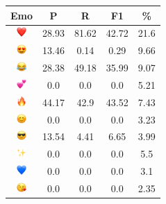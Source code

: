 \documentclass{article}
\begin{document}
\begin{table}
\centering
\begin{tabular}{|c|ccc|c|} \hline
\textbf{Emo} & \textbf{P} & \textbf{R} & \textbf{F1} & \textbf{\%} \\ \hline
\includegraphics[height=0.37cm,width=0.37cm]{img/red_heart.png} & 28.93 & 81.62 & 42.72 & 21.6\\ 
\includegraphics[height=0.37cm,width=0.37cm]{img/smiling_face_with_hearteyes.png} & 13.46 & 0.14 & 0.29 & 9.66\\ 
\includegraphics[height=0.37cm,width=0.37cm]{img/face_with_tears_of_joy.png} & 28.38 & 49.18 & 35.99 & 9.07\\ 
\includegraphics[height=0.37cm,width=0.37cm]{img/two_hearts.png} & 0.0 & 0.0 & 0.0 & 5.21\\ 
\includegraphics[height=0.37cm,width=0.37cm]{img/fire.png} & 44.17 & 42.9 & 43.52 & 7.43\\ 
\includegraphics[height=0.37cm,width=0.37cm]{img/smiling_face_with_smiling_eyes.png} & 0.0 & 0.0 & 0.0 & 3.23\\ 
\includegraphics[height=0.37cm,width=0.37cm]{img/smiling_face_with_sunglasses.png} & 13.54 & 4.41 & 6.65 & 3.99\\ 
\includegraphics[height=0.37cm,width=0.37cm]{img/sparkles.png} & 0.0 & 0.0 & 0.0 & 5.5\\ 
\includegraphics[height=0.37cm,width=0.37cm]{img/blue_heart.png} & 0.0 & 0.0 & 0.0 & 3.1\\ 
\includegraphics[height=0.37cm,width=0.37cm]{img/face_blowing_a_kiss.png} & 0.0 & 0.0 & 0.0 & 2.35\\ 

\end{tabular}
\end{table}
\end{document}
